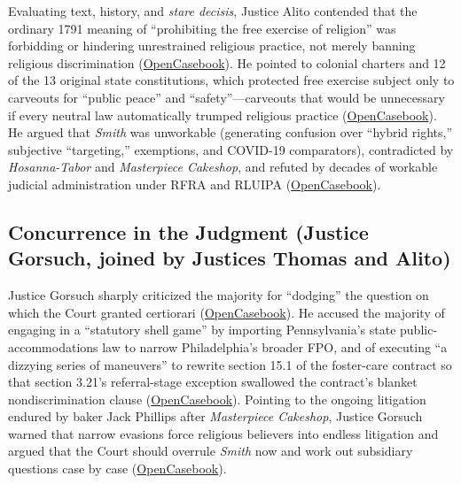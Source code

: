\documentclass[12pt]{article}
\begin{document}
Evaluating text, history, and \textit{stare decisis}, Justice Alito contended that the ordinary 1791 meaning of ``prohibiting the free exercise of religion'' was forbidding or hindering unrestrained religious practice, not merely banning religious discrimination (\href{https://opencasebook.org/casebooks/4501-constitutional-law/resources/12.9-fulton-v-city-of-philadelphia-2020/}{OpenCasebook}). He pointed to colonial charters and 12 of the 13 original state constitutions, which protected free exercise subject only to carveouts for ``public peace'' and ``safety''---carveouts that would be unnecessary if every neutral law automatically trumped religious practice (\href{https://opencasebook.org/casebooks/4501-constitutional-law/resources/12.9-fulton-v-city-of-philadelphia-2020/}{OpenCasebook}). He argued that \textit{Smith} was unworkable (generating confusion over ``hybrid rights,'' subjective ``targeting,'' exemptions, and COVID-19 comparators), contradicted by \textit{Hosanna-Tabor} and \textit{Masterpiece Cakeshop}, and refuted by decades of workable judicial administration under RFRA and RLUIPA (\href{https://opencasebook.org/casebooks/4501-constitutional-law/resources/12.9-fulton-v-city-of-philadelphia-2020/}{OpenCasebook}).

\subsection{Concurrence in the Judgment (Justice Gorsuch, joined by Justices Thomas and Alito)}
Justice Gorsuch sharply criticized the majority for ``dodging'' the question on which the Court granted certiorari (\href{https://opencasebook.org/casebooks/4501-constitutional-law/resources/12.9-fulton-v-city-of-philadelphia-2020/}{OpenCasebook}). He accused the majority of engaging in a ``statutory shell game'' by importing Pennsylvania's state public-accommodations law to narrow Philadelphia's broader FPO, and of executing ``a dizzying series of maneuvers'' to rewrite section 15.1 of the foster-care contract so that section 3.21's referral-stage exception swallowed the contract's blanket nondiscrimination clause (\href{https://opencasebook.org/casebooks/4501-constitutional-law/resources/12.9-fulton-v-city-of-philadelphia-2020/}{OpenCasebook}). Pointing to the ongoing litigation endured by baker Jack Phillips after \textit{Masterpiece Cakeshop}, Justice Gorsuch warned that narrow evasions force religious believers into endless litigation and argued that the Court should overrule \textit{Smith} now and work out subsidiary questions case by case (\href{https://opencasebook.org/casebooks/4501-constitutional-law/resources/12.9-fulton-v-city-of-philadelphia-2020/}{OpenCasebook}).
\end{document}
